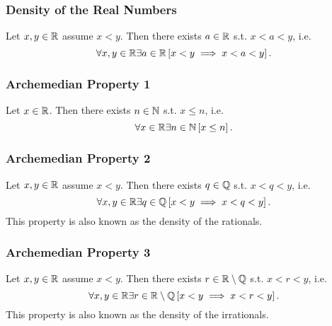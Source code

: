\subsubsection*{Density of the Real Numbers}
\uthm Let $x,y \in \mathbb{R}$ assume $x < y$. Then there exists $a \in \mathbb{R}$ s.t.
$x < a < y$, i.e.
\begin{equation*}
    \forall x, y \in \mathbb{R} \exists a \in \mathbb{R} \left[ x < y \implies x < a < y \right].
\end{equation*}


\subsubsection*{Archemedian Property 1}
\uthm Let $x \in \mathbb{R}$. Then there exists $n \in \mathbb{N}$ s.t. $x \leq n$, i.e.
\begin{equation*}
    \forall x \in \mathbb{R} \exists n \in \mathbb{N} \left[ x \leq n \right].
\end{equation*}


\subsubsection*{Archemedian Property 2}
\uthm Let $x,y \in \mathbb{R}$ assume $x < y$. Then there exists $q \in \mathbb{Q}$ s.t. $x < q < y$,
i.e.
\begin{equation*}
    \forall x, y \in \mathbb{R} \exists q \in \mathbb{Q} \left[ x < y \implies x < q < y \right].
\end{equation*}
This property is also known as the density of the rationals.


\subsubsection*{Archemedian Property 3}
\uthm Let $x,y \in \mathbb{R}$ assume $x < y$. Then there exists $r \in \mathbb{R} \setminus \mathbb{Q}$
s.t. $x < r < y$, i.e.
\begin{equation*}
    \forall x, y \in \mathbb{R} \exists r \in \mathbb{R} \setminus \mathbb{Q} \left[ x < y \implies x < r < y \right].
\end{equation*}
This property is also known as the density of the irrationals.


